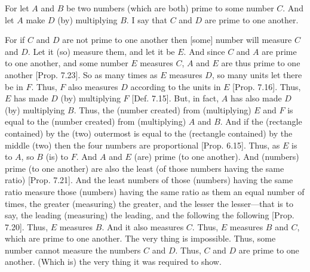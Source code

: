 \begin{Parallel}{}{}
{\epsfysize=2in
\centerline{}

For let $A$ and $B$ be two numbers (which are both) prime to some number $C$. And let $A$ make
$D$ (by) multiplying $B$. I say that $C$ and $D$ are prime to one another.

For if $C$ and $D$ are not prime to one another then [some] number will
measure $C$ and $D$. Let it (so) measure them, and let it be $E$. And since
$C$ and $A$ are prime to one another, and some number $E$ measures $C$, $A$ and $E$
are thus prime to one another  [Prop. 7.23].
So as many times as $E$ measures $D$, so many units let there be in $F$.
Thus, $F$ also measures $D$ according to the units in $E$ [Prop. 7.16]. Thus, $E$ has made $D$ (by) multiplying
$F$ [Def. 7.15]. But, in fact, $A$ has also made
$D$ (by) multiplying $B$.
 Thus, the (number created) from (multiplying) $E$ and $F$ is equal to the  (number created) from (multiplying) $A$ and $B$. And if the (rectangle contained) by the (two)
outermost is equal to the (rectangle contained) by the middle (two) then the
four numbers are proportional [Prop. 6.15].
Thus, as $E$ is to $A$, so $B$  (is) to $F$. And $A$ and $E$ (are) prime (to one another).
And (numbers) prime (to one another) are also the least (of those numbers having the same ratio)
[Prop. 7.21]. And the least numbers of those
(numbers) having the same ratio  measure those (numbers)
having the same ratio as them an equal number of times,
the greater (measuring) the greater, and the lesser the lesser---that is
to say, the leading (measuring) the leading, and the following the
following [Prop. 7.20]. Thus, $E$
measures $B$.  And it also measures $C$. Thus, $E$ measures $B$ and $C$, which
are prime to one another. The very thing is impossible. Thus, some
number cannot measure the numbers $C$ and $D$. Thus, $C$ and
$D$ are prime to one another. (Which is) the very thing it was required
to show.}
\end{Parallel}

